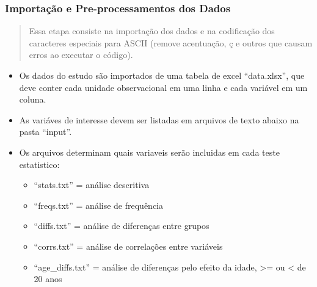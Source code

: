\documentclass[
]{article}
\providecommand{\tightlist}{%
  \setlength{\itemsep}{0pt}\setlength{\parskip}{0pt}}
\begin{document}
\hypertarget{importauxe7uxe3o-e-pre-processamentos-dos-dados}{%
\subsubsection{Importação e Pre-processamentos dos
Dados}\label{importauxe7uxe3o-e-pre-processamentos-dos-dados}}

\begin{quote}
Essa etapa consiste na importação dos dados e na codificação dos
caracteres especiais para ASCII (remove acentuação, ç e outros que
causam erros ao executar o código).
\end{quote}

\begin{itemize}
\tightlist
\item
  Os dados do estudo são importados de uma tabela de excel
  ``data.xlsx'', que deve conter cada unidade observacional em uma linha
  e cada variável em um coluna.
\item
  As variáves de interesse devem ser listadas em arquivos de texto
  abaixo na pasta ``input''.
\item
  Os arquivos determinam quais variaveis serão incluidas em cada teste
  estatistico:

  \begin{itemize}
  \tightlist
  \item
    ``stats.txt'' = análise descritiva
  \item
    ``freqs.txt'' = análise de frequência
  \item
    ``diffs.txt'' = análise de diferenças entre grupos
  \item
    ``corrs.txt'' = análise de correlações entre variáveis
  \item
    ``age\_diffs.txt'' = análise de diferenças pelo efeito da idade,
    \textgreater= ou \textless{} de 20 anos
  \end{itemize}
\end{itemize}
\end{document}
